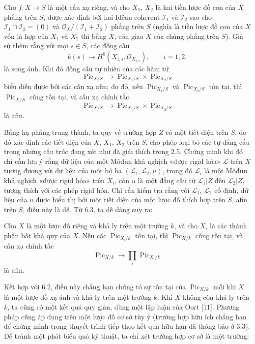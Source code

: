  Cho $f:X\longrightarrow S$ là một cấu xạ riêng, và cho
$X_1$, $X_2$ là hai tiền lược đồ con của $X$ phẳng trên $S$, được xác định bởi
hai Iđêan coherent $\mathcal I_1$ và $\mathcal I_2$ sao cho
$\mathcal I_1\cap\mathcal I_2=(0)$ và
$\mathcal O_X/(\mathcal I_1+\mathcal I_2)$ phẳng trên $S$ (nghĩa là tiền lược
đồ con của $X$ vốn là hợp của $X_1$ và $X_2$ thì bằng $X$, còn giao $X$ của chúng
phẳng trên $S$). Giả sử thêm rằng với mọi $s\in S$,
các đồng cấu
\[
k(s)\longrightarrow H^0(X_{i,s},\mathcal O_{X_{i,s}}),\qquad i=1,2,
\]
là song ánh. Khi đó đồng cấu tự nhiên của các hàm tử
\[
\operatorname{Pic}_{X/S}\longrightarrow
\operatorname{Pic}_{X_1/S}\times\operatorname{Pic}_{X_2/S}
\]
biểu diễn được bởi các cấu xạ afin; do đó, nếu
$\operatorname{Pic}_{X_1/S}$ và $\operatorname{Pic}_{X_2/S}$ tồn tại, thì
$\operatorname{Pic}_{X/S}$ cũng tồn tại, và cấu xạ chính tắc
\[
\operatorname{Pic}_{X/S}\longrightarrow
\operatorname{Pic}_{X_1/S}\times\operatorname{Pic}_{X_2/S}
\]
là afin.

Bằng hạ phẳng trung thành, ta quy về trường hợp $Z$ có một tiết diện trên $S$,
do đó xác định các tiết diện của $X$, $X_1$, $X_2$ trên $S$, cho phép loại bỏ
các tự đẳng cấu trong những cấu trúc đang xét như đã giải thích trong 2.5.
Chứng minh khi đó chỉ cần lưu ý rằng dữ liệu của một Môđun khả nghịch
«được rigid hóa» $\mathcal L$ trên $X$ tương đương với dữ liệu của một bộ ba
$(\mathcal L_1,\mathcal L_2,u)$, trong đó $\mathcal L_i$ là một Môđun khả
nghịch «được rigid hóa» trên $X_i$, còn $u$ là một đẳng cấu từ
$\mathcal L_1|Z$ đến $\mathcal L_2|Z$, tương thích với các phép rigid hóa. Chỉ
cần kiểm tra rằng với $\mathcal L_1$, $\mathcal L_2$ cố định, dữ liệu của $u$
được biểu thị bởi một tiết diện của một lược đồ thích hợp trên $S$, afin trên
$S$, điều này là dễ. Từ 6.3, ta dễ dàng suy ra:

 Cho $X$ là một lược đồ riêng và khả ly trên một trường
$k$, và cho $X_i$ là các thành phần bất khả quy của $X$. Nếu các
$\operatorname{Pic}_{X_i/k}$ tồn tại, thì $\operatorname{Pic}_{X/k}$ cũng tồn
tại, và cấu xạ chính tắc
\[
\operatorname{Pic}_{X/k}\longrightarrow\prod_i\operatorname{Pic}_{X_i/k}
\]
là afin.

Kết hợp với 6.2, điều này chẳng hạn chứng tỏ sự tồn tại của
$\operatorname{Pic}_{X/k}$ mỗi khi $X$ là một lược đồ xạ ảnh và khả ly trên
một trường $k$. Khi $X$ không còn khả ly trên $k$, ta cũng có một kết quả quy
giản, dùng một lập luận của Oort [11]. Phương pháp cũng áp dụng trên một lược đồ
cơ sở tùy ý (trường hợp hữu ích chẳng hạn để chứng minh trong thuyết trình tiếp
theo kết quả hữu hạn đã thông báo ở 3.3). Để tránh một phát biểu quá kỹ thuật,
ta chỉ xét trường hợp cơ sở là một trường:

